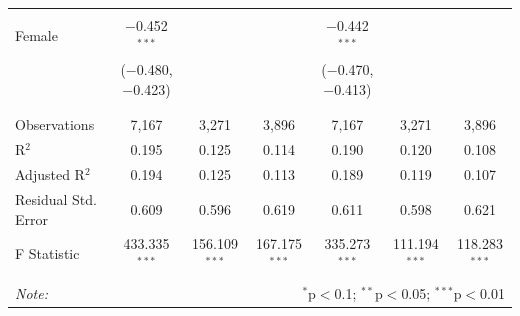\documentclass[12pt,a4paper]{article}
\numberwithin{equation}{section}
\begin{document}
\begin{landscape}
\begin{table}[!htbp]
\begin{tabular}{@{\extracolsep{5pt}}lcccccc}
			& & & & & & \\ 
			Female & $-$0.452$^{***}$ &  &  & $-$0.442$^{***}$ &  &  \\ 
			& ($-$0.480, $-$0.423) &  &  & ($-$0.470, $-$0.413) &  &  \\ 
			& & & & & & \\ 
			\hline \\[-1.8ex] 
			Observations & 7,167 & 3,271 & 3,896 & 7,167 & 3,271 & 3,896 \\ 
			R$^{2}$ & 0.195 & 0.125 & 0.114 & 0.190 & 0.120 & 0.108 \\ 
			Adjusted R$^{2}$ & 0.194 & 0.125 & 0.113 & 0.189 & 0.119 & 0.107 \\ 
			Residual Std. Error & 0.609 & 0.596 & 0.619 & 0.611 & 0.598 & 0.621 \\ 
			F Statistic & 433.335$^{***}$ & 156.109$^{***}$ & 167.175$^{***}$ & 335.273$^{***}$ & 111.194$^{***}$ & 118.283$^{***}$ \\ 
			\hline 
			\hline \\[-1.8ex] 
			\textit{Note:}  & \multicolumn{6}{r}{$^{*}$p$<$0.1; $^{**}$p$<$0.05; $^{***}$p$<$0.01} \\ 
		\end{tabular} 
	\end{table} 
	
\end{landscape}

\newpage
\end{document}
